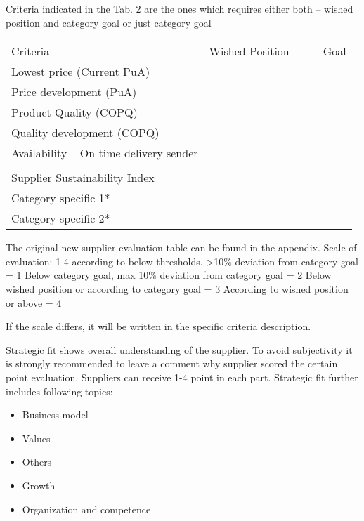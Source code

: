 \documentclass[oneside,12pt]{article}%
\begin{document}

Criteria indicated in the Tab. 2  are the ones which requires either both – wished position and category goal or just category goal

\begin{table}[h]

  \begin{tabular}{lllll}
    Criteria                               & Wished Position &  &  & Goal \\
    Lowest price (Current PuA)             &                 &  &  &      \\
    Price development (PuA)                &                 &  &  &      \\
    Product Quality (COPQ)                 &                 &  &  &      \\
    Quality development (COPQ)             &                 &  &  &      \\
    Availability – On time delivery sender &                 &  &  &      \\
    &                 &  &  &      \\
    Supplier Sustainability Index          &                 &  &  &      \\
    Category specific 1*                   &                 &  &  &      \\
    Category specific 2*                   &                 &  &  &
  \end{tabular}
\end{table}

The original new supplier evaluation table can be found in the appendix.
Scale of evaluation: 1-4 according to below thresholds.
>10\% deviation from category goal = 1
Below category goal, max 10\% deviation from category goal = 2
Below wished position or according to category goal = 3
According to wished position or above = 4

If the scale differs, it will be written in the specific criteria description.

Strategic fit shows overall understanding of the supplier. To avoid subjectivity it is strongly recommended to leave a comment why supplier scored the certain point evaluation. Suppliers can receive 1-4 point in each part. Strategic fit further includes following topics:
\begin{itemize}
  \item Business model
  \item Values
  \item Others
  \item Growth
  \item Organization and competence
\end{itemize}
\end{document}
